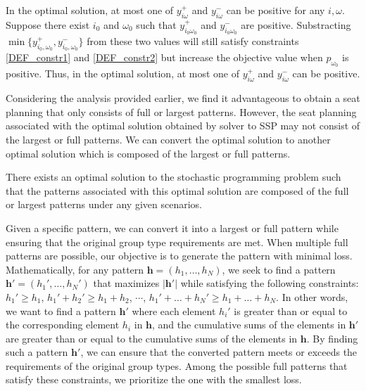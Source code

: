 
In the optimal solution, at most one of $y_{i \omega}^{+}$ and $y_{i \omega}^{-}$ can be positive for any $i, \omega$. Suppose there exist $i_0$ and $\omega_0$ such that $y_{i_0 \omega_0}^{+}$ and $y_{i_0 \omega_0}^{-}$ are positive. Substracting $\min\{y_{i_0, \omega_0}^{+}, y_{i_0, \omega_0}^{-}\}$ from these two values will still satisfy constraints \eqref{DEF_constr1} and \eqref{DEF_constr2} but increase the objective value when $p_{\omega_0}$ is positive. Thus, in the optimal solution, at most one of $y_{i \omega}^{+}$ and $y_{i \omega}^{-}$ can be positive.


Considering the analysis provided earlier, we find it advantageous to obtain a seat planning that only consists of full or largest patterns. However, the seat planning associated with the optimal solution obtained by solver to SSP may not consist of the largest or full patterns. We can convert the optimal solution to another optimal solution which is composed of the largest or full patterns.

\begin{prop}\label{prop_solution}
There exists an optimal solution to the stochastic programming problem such that the patterns associated with this optimal solution are composed of the full or largest patterns under any given scenarios.
\end{prop}


Given a specific pattern, we can convert it into a largest or full pattern while ensuring that the original group type requirements are met. When multiple full patterns are possible, our objective is to generate the pattern with minimal loss. Mathematically, for any pattern $\bm{h} = (h_1, \ldots, h_N)$, we seek to find a pattern $\bm{h}{'} = (h_1{'}, \ldots, h_N{'})$ that maximizes $|\bm{h}{'}|$ while satisfying the following constraints: $h_1{'} \geq h_1$, $h_1{'} + h_2{'} \geq h_1 + h_2$, $\cdots$, $h_1{'} + \ldots + h_N{'} \geq h_1 + \ldots + h_N$. In other words, we want to find a pattern $\bm{h}'$ where each element $h_i'$ is greater than or equal to the corresponding element $h_i$ in $\bm{h}$, and the cumulative sums of the elements in $\bm{h}'$ are greater than or equal to the cumulative sums of the elements in $\bm{h}$.
By finding such a pattern $\bm{h}'$, we can ensure that the converted pattern meets or exceeds the requirements of the original group types. Among the possible full patterns that satisfy these constraints, we prioritize the one with the smallest loss.

